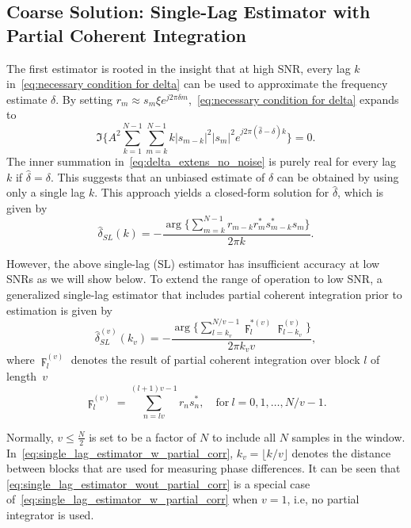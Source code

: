 \subsection{Coarse Solution: Single-Lag Estimator with Partial
  Coherent Integration}

The first estimator is rooted in the insight that at high SNR,
every lag $k$ in~\eqref{eq:necessary condition for delta}
can be used to approximate the frequency estimate $\delta$.
By setting $r_m\approx s_m\xi e^{j2\pi\delta m}$,~\eqref{eq:necessary condition for delta} expands to
\begin{equation}
  \label{eq:delta_extens_no_noise}
  \Im\bigg\{A^2\sum_{k=1}^{N-1}\sum_{m=k}^{N-1}k|s_{m-k}|^2|s_m|^2e^{j2\pi (\hat{\delta}-\delta)k}\bigg\}=0.
  \end{equation}
The inner summation in~\eqref{eq:delta_extens_no_noise} is purely real for every lag $k$ if $\hat{\delta}=\delta$.
This suggests that an unbiased estimate of $\delta$ can be obtained by
using only a single lag $k$.
This approach yields
a closed-form solution for $\hat{\delta}$, which is given by
\begin{equation}
  \label{eq:single_lag_estimator_wout_partial_corr}
  \hat{\delta}_{SL}(k)=-\frac{\arg\big\{\sum_{m=k}^{N-1}r_{m-k}r_m^*s_{m-k}^*s_m\big\}}{2\pi k}.
\end{equation}

However, the above single-lag (SL) estimator has insufficient
accuracy at low SNRs as we will show below.
To extend the range of operation to low SNR,
a generalized single-lag estimator that includes partial coherent integration
prior to estimation is given by
\begin{equation}
  \label{eq:single_lag_estimator_w_partial_corr}
  \hat{\delta}_{SL}^{(v)}(k_v)=-\frac{\arg\big\{\sum_{l=k_v}^{N/v-1}\digamma_l^{*(v)}\digamma_{l-k_v}^{(v)}\big\}}{2\pi k_vv},
\end{equation}
where $\digamma_{l}^{(v)}$ denotes the result of partial coherent integration over block $l$
of length~$v$
\begin{equation}
  \label{eq:coherent_integrator}
  \digamma_l^{(v)}=\sum_{n=lv}^{(l+1)v-1}r_ns_n^*, \quad \text{for}~l=0,1,\ldots,N/v{-}1.
\end{equation}

Normally, $v \leq \frac{N}{2}$ is set to be a factor of $N$ to include
all $N$ samples in the window.
In~\eqref{eq:single_lag_estimator_w_partial_corr}, $k_v=\lfloor k/v \rfloor$ denotes
the distance between blocks that are used for measuring phase differences.
It can be seen that 
\eqref{eq:single_lag_estimator_wout_partial_corr} is a special case of~\eqref{eq:single_lag_estimator_w_partial_corr}
when $v=1$, i.e,  no partial integrator is used.

